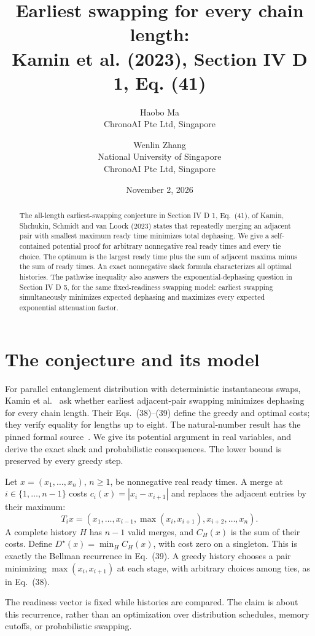 \documentclass[11pt,a4paper]{article}
\title{Earliest swapping for every chain length:\\
Kamin et al. (2023), Section IV D 1, Eq. (41)}
\author{Haobo Ma\\\small ChronoAI Pte Ltd, Singapore
\and Wenlin Zhang\\\small National University of Singapore\\
\small ChronoAI Pte Ltd, Singapore}
\date{November 2, 2026}
\newcommand{\Dstar}{D^{\star}}
\begin{document}
\maketitle
\begin{abstract}
The all-length earliest-swapping conjecture in Section IV D 1, Eq.~(41),
of Kamin, Shchukin, Schmidt and van Loock (2023) states that repeatedly
merging an adjacent pair with smallest maximum ready time minimizes total
dephasing. We give a self-contained potential proof for arbitrary
nonnegative real ready times and every tie choice. The optimum is the
largest ready time plus the sum of adjacent maxima minus the sum of ready
times. An exact nonnegative slack formula characterizes all optimal
histories. The pathwise inequality also answers the exponential-dephasing
question in Section IV D 5, for the same fixed-readiness swapping model:
earliest swapping simultaneously minimizes expected dephasing and maximizes
every expected exponential attenuation factor.
\end{abstract}

\section{The conjecture and its model}
For parallel entanglement distribution with deterministic instantaneous
swaps, Kamin et al.~\cite[Sec.~IV D 1, Eq.~(41), p.~023086-13]{kamin}
ask whether earliest adjacent-pair swapping minimizes dephasing for every
chain length. Their Eqs.~(38)--(39) define the greedy and optimal costs;
they verify equality for lengths up to eight. The natural-number result
has the pinned formal source~\cite{lean}. We give its potential argument
in real variables, and derive the exact slack and probabilistic
consequences. The lower bound is preserved by every greedy step.

Let $x=(x_1,\ldots,x_n)$, $n\geq1$, be nonnegative real ready times.
A merge at $i\in\{1,\ldots,n-1\}$ costs
$c_i(x)=|x_i-x_{i+1}|$ and replaces the adjacent entries by their maximum:
\[
 T_i x=(x_1,\ldots,x_{i-1},\max(x_i,x_{i+1}),x_{i+2},\ldots,x_n).
\]
A complete history $H$ has $n-1$ valid merges, and $C_H(x)$ is the sum
of their costs. Define $\Dstar(x)=\min_H C_H(x)$, with cost zero on a
singleton. This is exactly the Bellman recurrence in Eq.~(39).
A greedy history chooses a pair minimizing $\max(x_i,x_{i+1})$ at each
stage, with arbitrary choices among ties, as in Eq.~(38).

The readiness vector is fixed while histories are compared. The claim is
about this recurrence, rather than an optimization over distribution
schedules, memory cutoffs, or probabilistic swapping.
\end{document}
